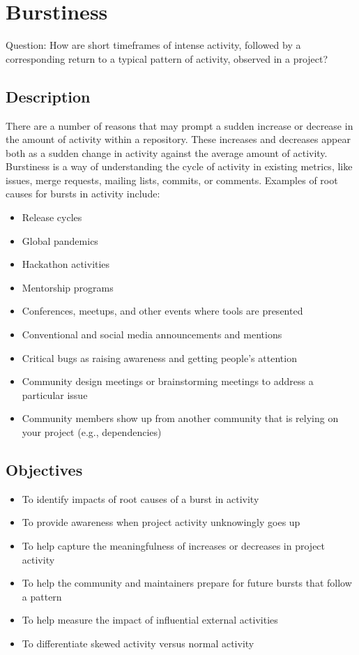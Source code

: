\hypertarget{burstiness}{%
\section{Burstiness}\label{burstiness}}

Question: How are short timeframes of intense activity, followed by a
corresponding return to a typical pattern of activity, observed in a
project?

\hypertarget{description}{%
\subsection{Description}\label{description}}

There are a number of reasons that may prompt a sudden increase or
decrease in the amount of activity within a repository. These increases
and decreases appear both as a sudden change in activity against the
average amount of activity. Burstiness is a way of understanding the
cycle of activity in existing metrics, like issues, merge requests,
mailing lists, commits, or comments. Examples of root causes for bursts
in activity include:

\begin{itemize}
\tightlist
\item
  Release cycles
\item
  Global pandemics
\item
  Hackathon activities
\item
  Mentorship programs
\item
  Conferences, meetups, and other events where tools are presented
\item
  Conventional and social media announcements and mentions
\item
  Critical bugs as raising awareness and getting people's attention
\item
  Community design meetings or brainstorming meetings to address a
  particular issue
\item
  Community members show up from another community that is relying on
  your project (e.g., dependencies)
\end{itemize}

\hypertarget{objectives}{%
\subsection{Objectives}\label{objectives}}

\begin{itemize}
\tightlist
\item
  To identify impacts of root causes of a burst in activity
\item
  To provide awareness when project activity unknowingly goes up
\item
  To help capture the meaningfulness of increases or decreases in
  project activity
\item
  To help the community and maintainers prepare for future bursts that
  follow a pattern
\item
  To help measure the impact of influential external activities
\item
  To differentiate skewed activity versus normal activity
\end{itemize}

